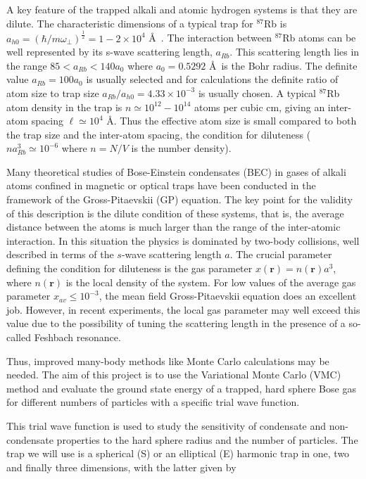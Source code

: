 \documentclass[%
oneside,                 %
final,                   %
10pt]{article}
\begin{document}
 A key feature of the trapped alkali and atomic hydrogen systems is that they are
 dilute. The characteristic dimensions of a typical trap for $^{87}$Rb is
 $a_{h0}=\left( {\hbar}/{m\omega_\perp}\right)^\frac{1}{2}=1-2 \times 10^4$
 \AA\ . The interaction between $^{87}$Rb atoms can be well represented
 by its s-wave scattering length, $a_{Rb}$. This scattering length lies in the
 range $85 < a_{Rb} < 140 a_0$ where $a_0 = 0.5292$ \AA\ is the Bohr radius.
 The definite value $a_{Rb} = 100 a_0$ is usually selected and
 for calculations the definite ratio of atom size to trap size 
 $a_{Rb}/a_{h0} = 4.33 \times 10^{-3}$ 
 is usually chosen. A typical $^{87}$Rb atom
 density in the trap is $n \simeq 10^{12}- 10^{14}$ atoms per cubic cm, giving an
 inter-atom spacing $\ell \simeq 10^4$ \AA. Thus the effective atom size is small
 compared to both the trap size and the inter-atom spacing, the condition
 for diluteness ($na^3_{Rb} \simeq 10^{-6}$ where $n = N/V$ is the number
 density). 

Many theoretical studies of Bose-Einstein condensates (BEC) in gases
of alkali atoms confined in magnetic or optical traps have been
conducted in the framework of the Gross-Pitaevskii (GP) equation.  The
key point for the validity of this description is the dilute condition
of these systems, that is, the average distance between the atoms is
much larger than the range of the inter-atomic interaction. In this
situation the physics is dominated by two-body collisions, well
described in terms of the $s$-wave scattering length $a$.  The crucial
parameter defining the condition for diluteness is the gas parameter
$x(\mathbf{r})= n(\mathbf{r}) a^3$, where $n(\mathbf{r})$ is the local density
of the system. For low values of the average gas parameter $x_{av}\le 10^{-3}$, the mean field Gross-Pitaevskii equation does an excellent
job.  However,
in recent experiments, the local gas parameter may well exceed this
value due to the possibility of tuning the scattering length in the
presence of a so-called Feshbach resonance.



Thus, improved many-body methods like Monte Carlo calculations may be
needed.  The aim of this project is to use the Variational Monte Carlo
(VMC) method and evaluate the ground state energy of a trapped, hard
sphere Bose gas for different numbers of particles with a specific
trial wave function.

 This trial wave function is used to study the sensitivity of
 condensate and non-condensate properties to the hard sphere radius
 and the number of particles.  The trap we will use is a spherical (S)
 or an elliptical (E) harmonic trap in one, two and finally three
 dimensions, with the latter given by
\end{document}

